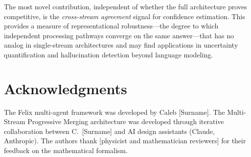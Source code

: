 \documentclass[11pt,a4paper]{article}
\theoremstyle{definition}
\theoremstyle{plain}
\theoremstyle{remark}
\begin{document}
The most novel contribution, independent of whether the full architecture 
proves competitive, is the \emph{cross-stream agreement} signal for 
confidence estimation. This provides a measure of representational 
robustness---the degree to which independent processing pathways converge 
on the same answer---that has no analog in single-stream architectures 
and may find applications in uncertainty quantification and hallucination 
detection beyond language modeling.

\section*{Acknowledgments}

The Felix multi-agent framework was developed by Caleb [Surname]. The 
Multi-Stream Progressive Merging architecture was developed through 
iterative collaboration between C.\ [Surname] and AI design assistants 
(Claude, Anthropic). The authors thank [physicist and mathematician 
reviewers] for their feedback on the mathematical formalism.
\end{document}
